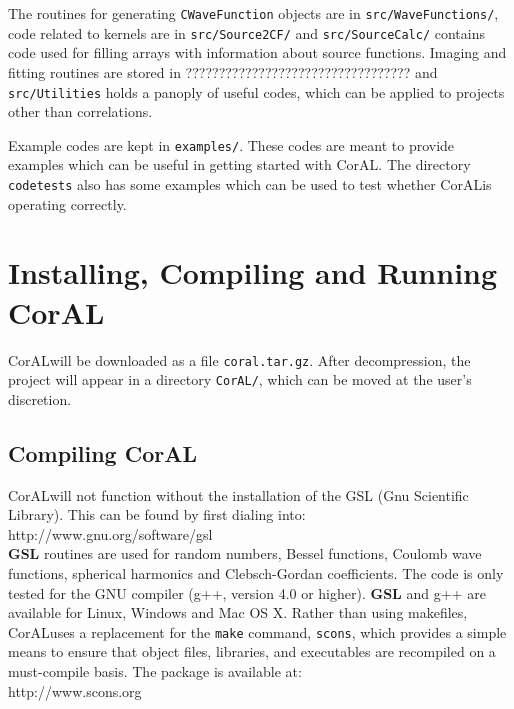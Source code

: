 \documentclass[10pt]{article}
\def\tab{\hspace*{9pt}}
\newcommand{\coral}{CorAL}
\begin{document}
The routines for generating {\tt CWaveFunction} objects are in {\tt src/WaveFunctions/}, code related to kernels are in {\tt src/Source2CF/} and {\tt src/SourceCalc/} contains code used for filling arrays with information about source functions. Imaging and fitting routines are stored in ??????????????????????????????????  and {\tt src/Utilities} holds a panoply of useful codes, which can be applied to projects other than correlations.

Example codes are kept in {\tt examples/}. These codes are meant to provide examples which can be useful in getting started with \coral. The directory {\tt codetests} also has some examples which can be used to test whether \coral is operating correctly.

\section{Installing, Compiling and Running \coral}

\coral will be downloaded as a file {\tt coral.tar.gz}. After decompression, the project will appear in a directory {\tt CorAL/}, which can be moved at the user's discretion.

\subsection{Compiling \coral}

\coral will not function without the installation of the GSL (Gnu Scientific Library). This can be found by first dialing into:\\
\tab http://www.gnu.org/software/gsl\\
{\bf GSL} routines are used for random numbers, Bessel functions, Coulomb wave functions, spherical harmonics and Clebsch-Gordan coefficients. The code is only tested for the GNU compiler (g++, version 4.0 or higher). {\bf GSL} and g++ are available for Linux, Windows and Mac OS X. Rather than using makefiles, \coral uses a replacement for the {\tt make} command, {\tt scons}, which provides a simple means to ensure that object files, libraries, and executables are recompiled on a must-compile basis. The package is available at:\\
\tab http://www.scons.org\\
\end{document}
